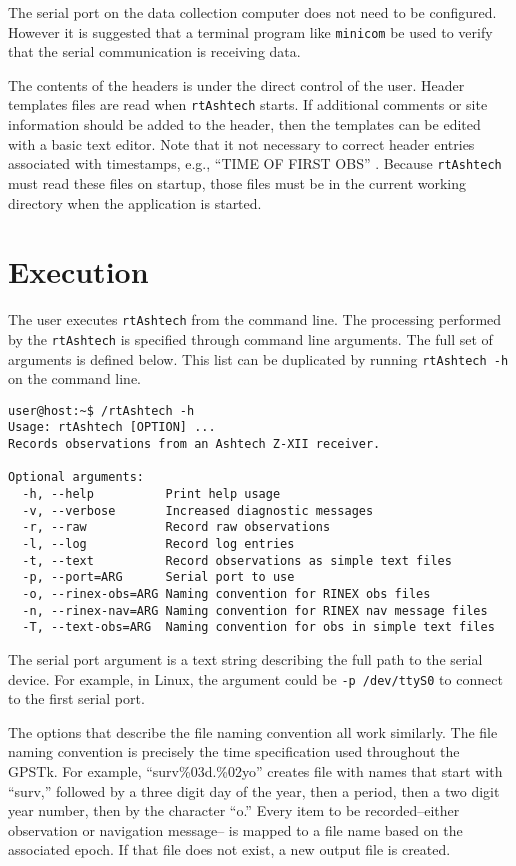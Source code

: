 The serial port on the data collection computer does not need to be 
configured. However it is suggested that a terminal program like
\texttt{minicom} be used to verify that the serial communication is 
receiving data.

The contents of the headers is under the direct control of the user. 
Header templates files are read when \texttt{rtAshtech} starts. If additional
comments or site information should be added to the header, then the
templates can be edited with a basic text editor. Note that it not
necessary to correct header entries associated with timestamps, e.g., 
``TIME OF FIRST OBS'' . Because \texttt{rtAshtech} must read these
files on startup, those files must be in the current working directory
when the application is started.


\section{Execution}

The user executes \texttt{rtAshtech} from the command line. The processing
performed by the \texttt{rtAshtech} is specified through command line
arguments. The full set of arguments is defined below. This list can be
duplicated by running \texttt{rtAshtech -h} on the command line.

\small
\begin{singlespace}
\begin{verbatim}
user@host:~$ /rtAshtech -h
Usage: rtAshtech [OPTION] ...
Records observations from an Ashtech Z-XII receiver.

Optional arguments:
  -h, --help          Print help usage
  -v, --verbose       Increased diagnostic messages
  -r, --raw           Record raw observations
  -l, --log           Record log entries
  -t, --text          Record observations as simple text files
  -p, --port=ARG      Serial port to use
  -o, --rinex-obs=ARG Naming convention for RINEX obs files
  -n, --rinex-nav=ARG Naming convention for RINEX nav message files
  -T, --text-obs=ARG  Naming convention for obs in simple text files
\end{verbatim}
\end{singlespace}
\normalsize

The serial port argument is a text string describing the full
path to the serial device. For example, in Linux, the argument could 
be \texttt{-p /dev/ttyS0} to connect to the first serial port.

The options that describe the file naming convention all work similarly.
The file naming convention is precisely the time specification used 
throughout the GPSTk. For example, ``surv\%03d.\%02yo'' creates file with names that start with
``surv,'' followed by a three digit day of the year, then a period, then a
two digit year number, then by the character ``o.''  Every item to be 
recorded--either observation or navigation message--
is mapped to a file name based on the associated epoch.
If that file does not exist, a new output file is created. 

